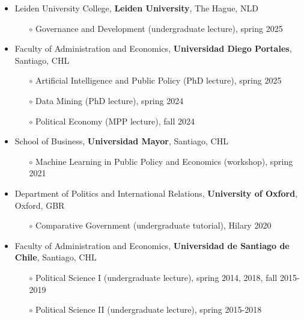 \begin{publications}

\begin{itemize}
\item{\small Leiden University College, {\bfseries Leiden University}, The Hague, NLD}
\begin{itemize}
\item[$\circ$]{\small Governance and Development (undergraduate lecture), spring 2025}
\end{itemize}
\item{\small Faculty of Administration and Economics, {\bfseries Universidad Diego Portales}, Santiago, CHL}
\begin{itemize}
\item[$\circ$]{\small Artificial Intelligence and Public Policy (PhD lecture), spring 2025}
\item[$\circ$]{\small Data Mining (PhD lecture), spring 2024}
\item[$\circ$]{\small Political Economy (MPP lecture), fall 2024}
\end{itemize}
\item{\small School of Business, {\bfseries Universidad Mayor}, Santiago, CHL}
\begin{itemize}
\item[$\circ$]{\small Machine Learning in Public Policy and Economics (workshop), spring 2021}
\end{itemize}
\item{\small Department of Politics and International Relations, {\bfseries University of Oxford}, Oxford, GBR}
\begin{itemize}
\item[$\circ$]{\small Comparative Government (undergraduate tutorial), Hilary 2020}
\end{itemize}
\item{\small Faculty of Administration and Economics, {\bfseries Universidad de Santiago de Chile}, Santiago, CHL}
\begin{itemize}
\item[$\circ$]{\small Political Science I (undergraduate lecture), spring 2014, 2018, fall 2015-2019}
\item[$\circ$]{\small Political Science II (undergraduate lecture), spring 2015-2018}

\end{itemize}
\end{itemize}
\end{publications}
